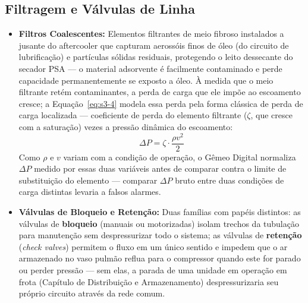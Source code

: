 \documentclass[12pt,a4paper]{article}
\numberwithin{equation}{section}
\numberwithin{table}{section}
\numberwithin{figure}{section}
\begin{document}
	\subsection{\textbf{Filtragem e Válvulas de Linha}}
	\begin{itemize}
		\item \textbf{Filtros Coalescentes:} Elementos filtrantes de meio fibroso instalados a jusante do aftercooler que capturam aerossóis finos de óleo (do circuito de lubrificação) e partículas sólidas residuais, protegendo o leito dessecante do secador PSA — o material adsorvente é facilmente contaminado e perde capacidade permanentemente se exposto a óleo. À medida que o meio filtrante retém contaminantes, a perda de carga que ele impõe ao escoamento cresce; a Equação~\eqref{eq:s3-4} modela essa perda pela forma clássica de perda de carga localizada — coeficiente de perda do elemento filtrante ($\zeta$, que cresce com a saturação) vezes a pressão dinâmica do escoamento:
		\begin{equation}\label{eq:s3-4}
 \Delta P = \zeta \cdot \frac{\rho v^2}{2}
\end{equation}
		Como $\rho$ e $v$ variam com a condição de operação, o Gêmeo Digital normaliza $\Delta P$ medido por essas duas variáveis antes de comparar contra o limite de substituição do elemento — comparar $\Delta P$ bruto entre duas condições de carga distintas levaria a falsos alarmes.
		\item \textbf{Válvulas de Bloqueio e Retenção:} Duas famílias com papéis distintos: as válvulas de \textbf{bloqueio} (manuais ou motorizadas) isolam trechos da tubulação para manutenção sem despressurizar todo o sistema; as válvulas de \textbf{retenção} (\textit{check valves}) permitem o fluxo em um único sentido e impedem que o ar armazenado no vaso pulmão reflua para o compressor quando este for parado ou perder pressão — sem elas, a parada de uma unidade em operação em frota (Capítulo de Distribuição e Armazenamento) despressurizaria seu próprio circuito através da rede comum.
	\end{itemize}
	
\end{document}
